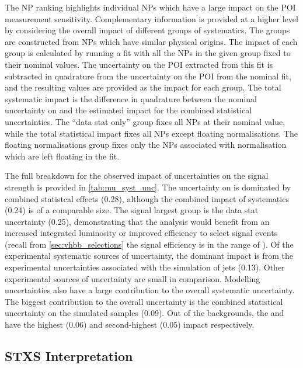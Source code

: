 The NP ranking highlights individual NPs which have a large impact on the POI measurement sensitivity.
Complementary information is provided at a higher level by considering the overall impact of different groups of systematics.
The groups are constructed from NPs which have similar physical origins.
The impact of each group is calculated by running a fit with all the NPs in the given group fixed to their nominal values.
The uncertainty on the POI extracted from this fit is subtracted in quadrature from the uncertainty on the POI from the nominal fit, and the resulting values are provided as the impact for each group.
The total systematic impact is the difference in quadrature between the nominal uncertainty on \muVH and the estimated impact for the combined statistical uncertainties.
The ``data stat only'' group fixes all NPs at their nominal value, while the total statistical impact fixes all NPs except floating normalisations.
The floating normalisations group fixes only the NPs associated with normalisation which are left floating in the fit.

The full breakdown for the observed impact of uncertainties on the \muVH signal strength is provided in \cref{tab:mu_syst_unc}.
The uncertainty on \muVH is dominated by combined statistcal effects (0.28), although the combined impact of systematics (0.24) is of a comparable size.
The signal largest group is the data stat uncertainty (0.25), demonstrating that the analysis would benefit from an increased integrated luminosity or improved efficiency to select signal events (recall from \cref{sec:vhbb_selections} the signal efficiency is in the range of ).
Of the experimental systematic sources of uncertainty, the dominant impact is from the experimental uncertainties associated with the simulation of \largeR jets (0.13).
Other experimental sources of uncertainty are small in comparison.
Modelling uncertainties also have a large contribution to the overall systematic uncertainty.
The biggest contribution to the overall uncertainty is the combined statistical uncertainty on the simulated samples (0.09).
Out of the backgrounds, the \Wjets and \Zjets have the highest (0.06) and second-highest (0.05) impact respectively.



\subsection{STXS Interpretation}\label{sec:stxs}

